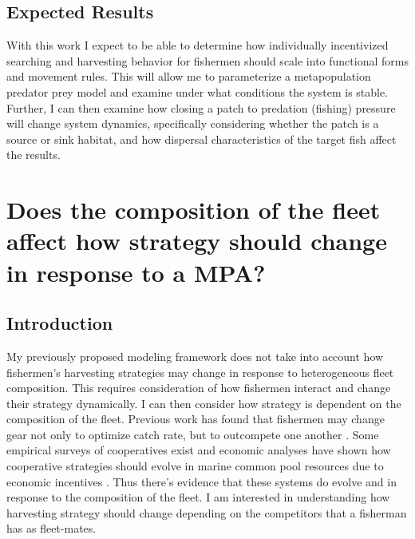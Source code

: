 \documentclass[12pt,a4paper]{report}
\begin{document}
\subsection{Expected Results}
With this work I expect to be able to determine how individually incentivized searching and harvesting behavior for fishermen should scale into functional forms and movement rules. This will allow me to parameterize a metapopulation predator prey model and examine under what conditions the system is stable. Further, I can then examine how closing a patch to predation (fishing) pressure will change system dynamics, specifically considering whether the patch is a source or sink habitat, and how dispersal characteristics of the target fish affect the results. 
\section{Does the composition of the fleet affect how strategy should change in response to a MPA?}

\subsection{Introduction}
My previously proposed modeling framework does not take into account how fishermen's harvesting strategies may change in response to heterogeneous fleet composition. This requires consideration of how fishermen interact and change their strategy dynamically. I can then consider how strategy is dependent on the composition of the fleet. Previous work has found that fishermen may change gear not only to optimize catch rate, but to outcompete one another \citep{Rijnsdorpetal:2008}. Some empirical surveys of cooperatives exist \citep{Ovando2013132} and economic analyses have shown how cooperative strategies should evolve in marine common pool resources due to economic incentives \citep{KittsEdwards:2003}. Thus there's evidence that these systems do evolve and in response to the composition of the fleet. I am interested in understanding how harvesting strategy should change depending on the competitors that a fisherman has as fleet-mates. 
\end{document}
